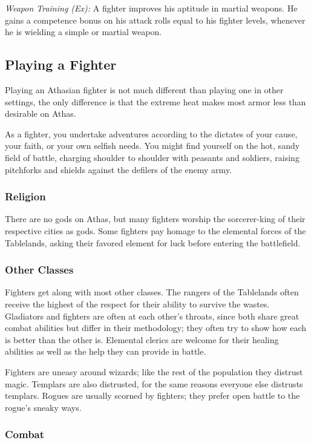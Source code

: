 \textit{Weapon Training (Ex):} A fighter improves his aptitude in martial weapons. He gains a competence bonus on his attack rolls equal to \onequarter his fighter levels, whenever he is wielding a simple or martial weapon.

\subsection{Playing a Fighter}
Playing an Athasian fighter is not much different than playing one in other settings, the only difference is that the extreme heat makes most armor less than desirable on Athas.

As a fighter, you undertake adventures according to the dictates of your cause, your faith, or your own selfish needs. You might find yourself on the hot, sandy field of battle, charging shoulder to shoulder with peasants and soldiers, raising pitchforks and shields against the defilers of the enemy army.

\subsubsection{Religion}

There are no gods on Athas, but many fighters worship the sorcerer-king of their respective cities as gods. Some fighters pay homage to the elemental forces of the Tablelands, asking their favored element for luck before entering the battlefield.

\subsubsection{Other Classes}

Fighters get along with most other classes. The rangers of the Tablelands often receive the highest of the respect for their ability to survive the wastes. Gladiators and fighters are often at each other's throats, since both share great combat abilities but differ in their methodology; they often try to show how each is better than the other is. Elemental clerics are welcome for their healing abilities as well as the help they can provide in battle.

Fighters are uneasy around wizards; like the rest of the population they distrust magic. Templars are also distrusted, for the same reasons everyone else distrusts templars. Rogues are usually scorned by fighters; they prefer open battle to the rogue's sneaky ways.

\subsubsection{Combat}

